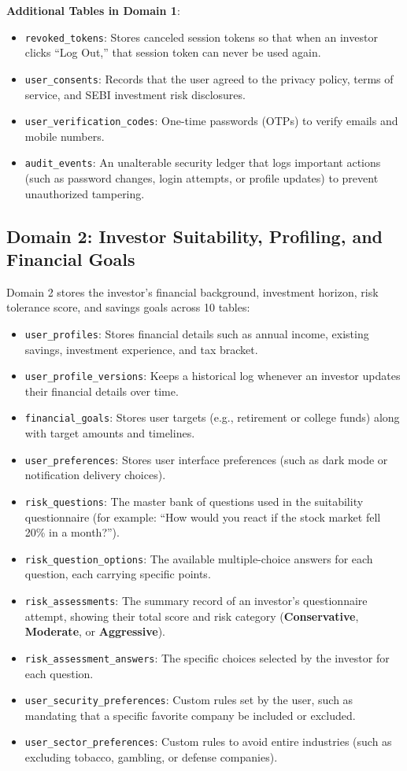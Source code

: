 \noindent \textbf{Additional Tables in Domain 1}:
\begin{itemize}
    \item \texttt{revoked\_tokens}: Stores canceled session tokens so that when an investor clicks ``Log Out,'' that session token can never be used again.
    \item \texttt{user\_consents}: Records that the user agreed to the privacy policy, terms of service, and SEBI investment risk disclosures.
    \item \texttt{user\_verification\_codes}: One-time passwords (OTPs) to verify emails and mobile numbers.
    \item \texttt{audit\_events}: An unalterable security ledger that logs important actions (such as password changes, login attempts, or profile updates) to prevent unauthorized tampering.
\end{itemize}

\clearpage
\subsection{Domain 2: Investor Suitability, Profiling, and Financial Goals}
Domain 2 stores the investor's financial background, investment horizon, risk tolerance score, and savings goals across 10 tables:
\begin{itemize}
    \item \texttt{user\_profiles}: Stores financial details such as annual income, existing savings, investment experience, and tax bracket.
    \item \texttt{user\_profile\_versions}: Keeps a historical log whenever an investor updates their financial details over time.
    \item \texttt{financial\_goals}: Stores user targets (e.g., retirement or college funds) along with target amounts and timelines.
    \item \texttt{user\_preferences}: Stores user interface preferences (such as dark mode or notification delivery choices).
    \item \texttt{risk\_questions}: The master bank of questions used in the suitability questionnaire (for example: ``How would you react if the stock market fell 20\% in a month?'').
    \item \texttt{risk\_question\_options}: The available multiple-choice answers for each question, each carrying specific points.
    \item \texttt{risk\_assessments}: The summary record of an investor's questionnaire attempt, showing their total score and risk category (\textbf{Conservative}, \textbf{Moderate}, or \textbf{Aggressive}).
    \item \texttt{risk\_assessment\_answers}: The specific choices selected by the investor for each question.
    \item \texttt{user\_security\_preferences}: Custom rules set by the user, such as mandating that a specific favorite company be included or excluded.
    \item \texttt{user\_sector\_preferences}: Custom rules to avoid entire industries (such as excluding tobacco, gambling, or defense companies).
\end{itemize}

